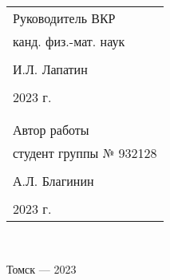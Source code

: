 \begin{flushright}\linespread{0.9}
	\normalsize{ 
		\begin{tabular}{@{}l@{}}
			Руководитель ВКР\\
			канд. физ.-мат. наук\\\\ \underline{\hspace{3.5cm}} И.Л. Лапатин\\\\
			\textquote{\underline{\hspace{1cm}}}\underline{\hspace{4cm}}2023 г.\\
			\break
			\\\\
			Автор работы\\
			студент группы № 932128\\\\ \underline{\hspace{3.5cm}} А.Л. Благинин\\\\
			\textquote{\underline{\hspace{1cm}}}\underline{\hspace{4cm}}2023 г.
		\end{tabular}	
	}\\
	
\end{flushright}
\hfill \break
\hfill \break
\hfill \break
\begin{center} Томск --- 2023 \end{center}
\thispagestyle{empty} %
\clearpage
